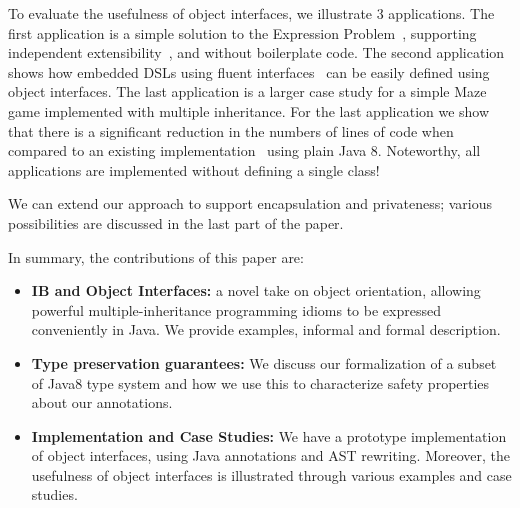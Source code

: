 To evaluate the usefulness of object interfaces, we illustrate 3
applications. The first application is a simple 
solution to the Expression Problem~\cite{wadler98expression}, supporting independent 
extensibility~\cite{zenger05independentlyextensible}, and without boilerplate code. The second
application shows how embedded DSLs using fluent interfaces~\cite{fowler2005fluentinterface} 
can be easily defined using object interfaces. The last
application is a larger case study for a simple Maze game implemented with 
multiple inheritance. For the last application we show that there is a
significant reduction in the numbers of lines of code when compared 
to an existing implementation~\cite{bono14} using plain Java 8. 
Noteworthy, all applications are implemented 
without defining a single class!

We can extend our approach to support encapsulation and privateness;
various possibilities are discussed in the last part of the paper.


In summary, the contributions of this paper are:
\begin{itemize}

\item {\bf IB and Object Interfaces:} a novel take on object orientation, allowing
  powerful multiple-inheritance programming idioms to be expressed
  conveniently in Java. We provide examples, informal and formal description.

\item{\bf Type preservation guarantees:}
We discuss our formalization of a subset of Java8 type system and how we use this
to characterize safety properties about our annotations.

\item {\bf Implementation and Case Studies:} We have a prototype
  implementation of object interfaces, using Java
  annotations and AST rewriting. Moreover, the usefulness of object interfaces is
  illustrated through various examples and case studies.


\end{itemize}
